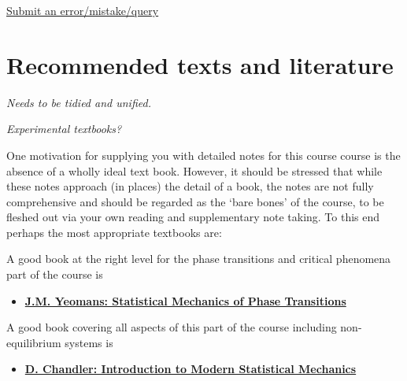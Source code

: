 \documentclass[
  letterpaper,
  enabledeprecatedfontcommands]{report}
\providecommand{\tightlist}{%
  \setlength{\itemsep}{0pt}\setlength{\parskip}{0pt}}
\begin{document}
\begin{tcolorbox}[enhanced jigsaw, breakable, colframe=quarto-callout-note-color-frame, colback=white, arc=.35mm, left=2mm, leftrule=.75mm, bottomrule=.15mm, rightrule=.15mm, toprule=.15mm, opacityback=0]

\href{https://forms.office.com/e/6uL2Bd5QGq}{Submit an
error/mistake/query}

\end{tcolorbox}


\chapter*{Recommended texts and literature}\label{literature}


\emph{Needs to be tidied and unified.}

\emph{Experimental textbooks?}

One motivation for supplying you with detailed notes for this course
course is the absence of a wholly ideal text book. However, it should be
stressed that while these notes approach (in places) the detail of a
book, the notes are not fully comprehensive and should be regarded as
the `bare bones' of the course, to be fleshed out via your own reading
and supplementary note taking. To this end perhaps the most appropriate
textbooks are:

A good book at the right level for the phase transitions and critical
phenomena part of the course is

\begin{itemize}
\tightlist
\item
  \textbf{\href{https://bris.on.worldcat.org/search/detail/24699159?queryString=yeomans\%20statistical&clusterResults=true&stickyFacetsChecked=true&groupVariantRecords=false&newsArticles=off&bookReviews=off}{J.M.
  Yeomans: Statistical Mechanics of Phase Transitions}}
\end{itemize}

A good book covering all aspects of this part of the course including
non-equilibrium systems is

\begin{itemize}
\tightlist
\item
  \textbf{\href{https://bris.on.worldcat.org/search/detail/941821555?queryString=chandler\%20statistical&clusterResults=true&stickyFacetsChecked=true&groupVariantRecords=false&newsArticles=off&bookReviews=off}{D.
  Chandler: Introduction to Modern Statistical Mechanics}}
\end{itemize}
\end{document}

